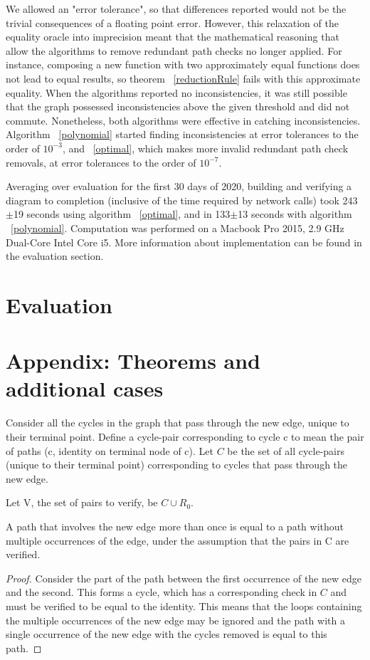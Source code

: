 \documentclass[sigplan,review,anonymous]{acmart}
\begin{document}
We allowed an "error tolerance", so that differences reported would not be the trivial consequences of a floating point error.
However, this relaxation of the equality oracle into imprecision meant that the mathematical reasoning that allow the algorithms to remove redundant path checks no longer applied.
For instance, composing a new function with two approximately equal functions does not lead to equal results, so theorem ~\ref{reductionRule} fails with this approximate equality.
When the algorithms reported no inconsistencies, it was still possible that the graph possessed inconsistencies above the given threshold and did not commute.
Nonetheless, both algorithms were effective in catching inconsistencies. Algorithm ~\ref{polynomial} started finding inconsistencies at error tolerances to the order of $10^{-3}$, and ~\ref{optimal}, which makes more invalid redundant path check removals, at error tolerances to the order of $10^{-7}$.

Averaging over evaluation for the first 30 days of 2020, building and verifying a diagram to completion (inclusive of the time required by network calls) took 243$\pm$19 seconds using algorithm ~\ref{optimal}, and in 133$\pm$13 seconds with algorithm ~\ref{polynomial}. 
Computation was performed on a Macbook Pro 2015, 2.9 GHz Dual-Core Intel Core i5.
More information about implementation can be found in the evaluation section.

\section{Evaluation}

\section{Appendix: Theorems and additional cases}

Consider all the cycles in the graph that pass through the new edge, unique to their terminal point.
Define a cycle-pair corresponding to cycle c to mean the pair of paths (c, identity on terminal node of c).
Let $C$ be the set of all cycle-pairs (unique to their terminal point) corresponding to cycles that pass through the new edge.

Let V, the set of pairs to verify, be $C \cup R_0$.

\begin{lemma}
\label{one_occurence_lemma}
A path that involves the new edge more than once is equal to a path without multiple occurrences of the edge, under the assumption that the pairs in C are verified.
\end{lemma}
\begin{proof}
Consider the part of the path between the first occurrence of the new edge and the second. This forms a cycle, which has a corresponding check in $C$ and must be verified to be equal to the identity.
This means that the loops containing the multiple occurrences of the new edge may be ignored and the path with a single occurrence of the new edge with the cycles removed is equal to this path.
\end{proof}
\end{document}
